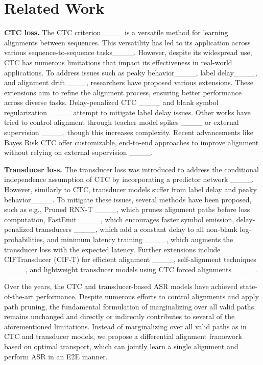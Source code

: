 \section{Related Work}
\textbf{CTC loss.}
The CTC criterion____ is a versatile method for learning alignments between sequences. This versatility has led to its application across various sequence-to-sequence tasks____. However, despite its widespread use, CTC has numerous limitations that impact its effectiveness in real-world applications. 
To address issues such as peaky behavior____, label delay____, and alignment drift____, researchers have proposed various extensions. These extensions aim to refine the alignment process, ensuring better performance across diverse tasks.
Delay-penalized CTC ____ and blank symbol regularization ____ attempt to mitigate label delay issues. Other works have tried to control alignment through teacher model spikes ____ or external supervision ____, though this increases complexity.
Recent advancements like Bayes Risk CTC offer customizable, end-to-end approaches to improve alignment without relying on external supervision ____.

\textbf{Transducer loss.}  
The transducer loss was introduced to address the conditional independence assumption of CTC by incorporating a predictor network ____.
However, similarly to CTC, transducer models suffer from label delay and peaky behavior____.
To mitigate these issues, several methods have been proposed, such as e.g., Pruned RNN-T ____, which prunes alignment paths before loss computation, FastEmit ____, which encourages faster symbol emission, delay-penalized transducers ____, which add a constant delay to all non-blank log-probabilities, and minimum latency training ____, which augments the transducer loss with the expected latency.
Further extensions include CIFTransducer (CIF-T) for efficient alignment ____, self-alignment techniques ____, and lightweight transducer models using CTC forced alignments ____.

Over the years, the CTC and transducer-based ASR models have achieved state-of-the-art performance.
Despite numerous efforts to control alignments and apply path pruning, the fundamental formulation of marginalizing over all valid paths remains unchanged and directly or indirectly contributes to several of the aforementioned limitations.
Instead of marginalizing over all valid paths as in CTC and transducer models, we propose a differential alignment framework based on optimal transport, which can jointly learn a single alignment and perform ASR in an E2E manner.

